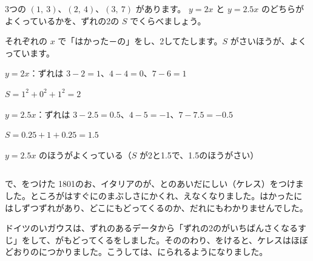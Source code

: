 \begin{kotoba}
\small
{}
\end{kotoba}


\begin{reidai}
3つの $(1,\ 3)$、$(2,\ 4)$、$(3,\ 7)$ があります。 $y=2x$ と $y=2.5x$ のどちらがよくっているかを、ずれの2の $S$ でくらべましょう。\par
\kangaekata それぞれの $x$ で「はかった－の」をし、2してたします。$S$ がさいほうが、よくっています。\par
\shiki $y=2x$：ずれは $3-2=1$、$4-4=0$、$7-6=1$\par
\hspace*{2.6\zw}$S=1^2+0^2+1^2=2$\par
\hspace*{2.6\zw}$y=2.5x$：ずれは $3-2.5=0.5$、$4-5=-1$、$7-7.5=-0.5$\par
\hspace*{2.6\zw}$S=0.25+1+0.25=1.5$\par
\kotae $y=2.5x$ のほうがよくっている（$S$ が2と1.5で、1.5のほうがさい）
\end{reidai}

\begin{column}{で、をつけた}
1801のお、イタリアのが、とのあいだにしい（ケレス）をつけました。ところがはすぐにのまぶしさにかくれ、えなくなりました。はかったにはしずつずれがあり、どこにもどってくるのか、だれにもわかりませんでした。\par
ドイツのいガウスは、ずれのあるデータから「ずれの2のがいちばんさくなるすじ」をして、がもどってくるをしました。そののわり、をけると、ケレスはほぼどおりのにつかりました。こうしては、にられるようになりました。
\end{column}

